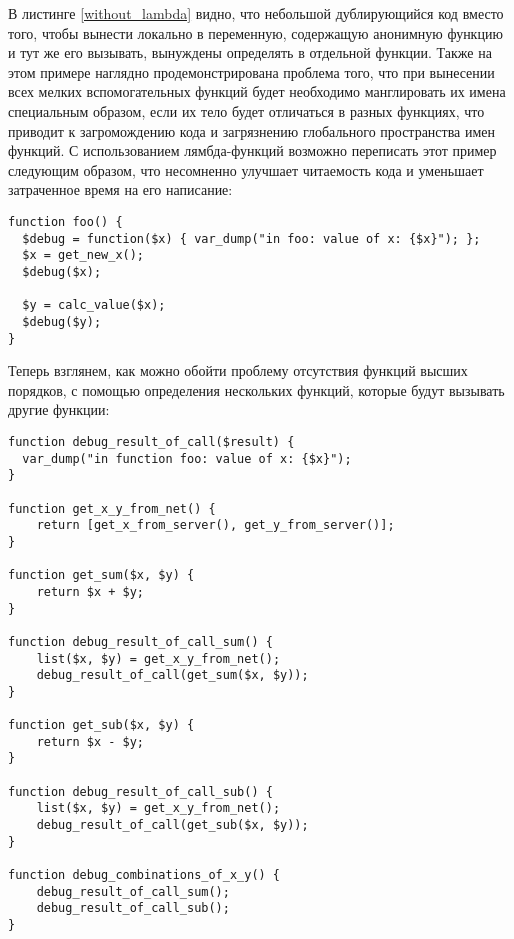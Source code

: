 В листинге \ref{without_lambda} видно, что небольшой дублирующийся код вместо того, чтобы вынести локально в переменную, содержащую анонимную функцию и тут же его вызывать, вынуждены определять в отдельной функции.
Также на этом примере наглядно продемонстрирована проблема того, что при вынесении всех мелких вспомогательных функций будет необходимо манглировать их имена специальным образом, если их тело будет отличаться в разных функциях, что приводит к загромождению кода и загрязнению глобального пространства имен функций.
С использованием лямбда-функций возможно переписать этот пример следующим образом, что несомненно улучшает читаемость кода и уменьшает затраченное время на его написание:
\begin{lstlisting}
function foo() {
  $debug = function($x) { var_dump("in foo: value of x: {$x}"); };
  $x = get_new_x();
  $debug($x);

  $y = calc_value($x);
  $debug($y);
}
\end{lstlisting}

Теперь взглянем, как можно обойти проблему отсутствия функций высших порядков, с помощью определения нескольких функций, которые будут вызывать другие функции:
\begin{lstlisting}[caption={Пример кода без функций высших порядков},label={without_getting_lambda}]
function debug_result_of_call($result) {
  var_dump("in function foo: value of x: {$x}");
}

function get_x_y_from_net() {
	return [get_x_from_server(), get_y_from_server()];
}

function get_sum($x, $y) {
    return $x + $y;
}

function debug_result_of_call_sum() {
	list($x, $y) = get_x_y_from_net();
	debug_result_of_call(get_sum($x, $y));
}

function get_sub($x, $y) {
    return $x - $y;
}

function debug_result_of_call_sub() {
	list($x, $y) = get_x_y_from_net();
	debug_result_of_call(get_sub($x, $y));
}

function debug_combinations_of_x_y() {
	debug_result_of_call_sum();
	debug_result_of_call_sub();
}
\end{lstlisting}

